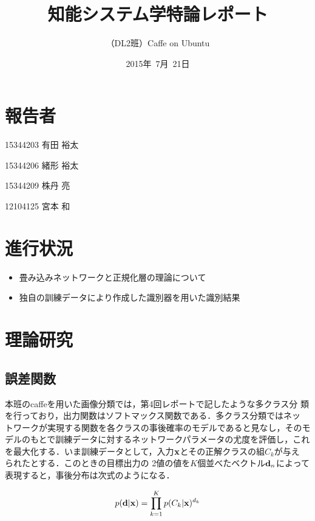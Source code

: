 \documentclass[a4paper,10pt]{jsarticle}
\title{知能システム学特論レポート}
\author{
（DL2班）Caffe on Ubuntu\\
}
\date{2015年\ 7月\ 21日}
\begin{document}
\maketitle
\section{報告者}
\begin{list}{}{}
 \item 15344203\hspace{0.5cm} 有田 裕太
 \item 15344206\hspace{0.5cm} 緒形 裕太
 \item 15344209\hspace{0.5cm} 株丹 亮
 \item 12104125\hspace{0.5cm} 宮本 和
\end{list}

\section{進行状況}

\begin{itemize}
\item 畳み込みネットワークと正規化層の理論について
\item 独自の訓練データにより作成した識別器を用いた識別結果
\end{itemize}

\section{理論研究}

\subsection{誤差関数}
本班のcaffeを用いた画像分類では，第4回レポートで記したような多クラス分
類を行っており，出力関数はソフトマックス関数である．多クラス分類ではネッ
トワークが実現する関数を各クラスの事後確率のモデルであると見なし，そのモ
デルのもとで訓練データに対するネットワークパラメータの尤度を評価し，これ
を最大化する．いま訓練データとして，入力${\bf x}$とその正解クラスの組$C_k$が与え
られたとする．このときの目標出力の
2値の値を$K$個並べたベクトル${\bf
d}_n$によって表現すると，事後分布は次式のようになる．

\begin{equation}
 p({\bf d}|{\bf x}) = \prod_{k=1}^{K}p(C_k|{\bf x})^{d_k}
\end{equation}
\end{document}
